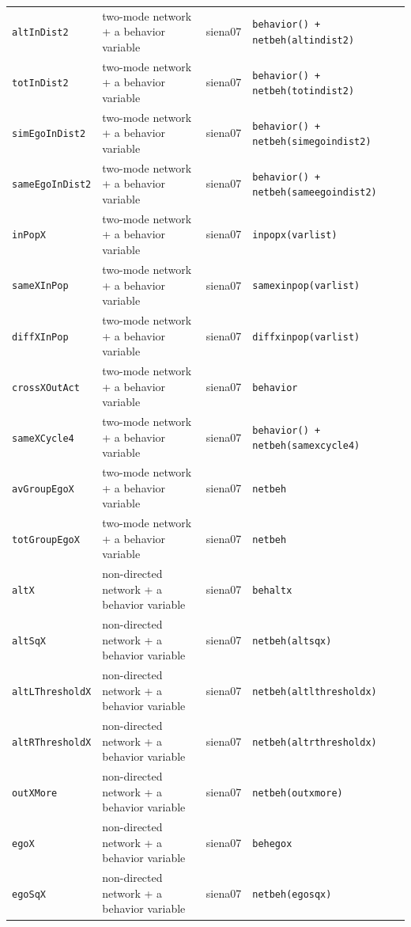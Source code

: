 \begin{longtable}{@{}p{2.6cm}p{3.2cm}p{2.9cm}p{5.4cm}@{}}
\texttt{altInDist2} & two-mode network + a behavior variable & siena07 & \texttt{behavior() + netbeh(altindist2)}\\
\texttt{totInDist2} & two-mode network + a behavior variable & siena07 & \texttt{behavior() + netbeh(totindist2)}\\
\texttt{simEgoInDist2} & two-mode network + a behavior variable & siena07 & \texttt{behavior() + netbeh(simegoindist2)}\\
\texttt{sameEgoInDist2} & two-mode network + a behavior variable & siena07 & \texttt{behavior() + netbeh(sameegoindist2)}\\
\texttt{inPopX} & two-mode network + a behavior variable & siena07 & \texttt{inpopx(varlist)}\\
\texttt{sameXInPop} & two-mode network + a behavior variable & siena07 & \texttt{samexinpop(varlist)}\\
\texttt{diffXInPop} & two-mode network + a behavior variable & siena07 & \texttt{diffxinpop(varlist)}\\
\texttt{crossXOutAct} & two-mode network + a behavior variable & siena07 & \texttt{behavior}\\
\texttt{sameXCycle4} & two-mode network + a behavior variable & siena07 & \texttt{behavior() + netbeh(samexcycle4)}\\
\texttt{avGroupEgoX} & two-mode network + a behavior variable & siena07 & \texttt{netbeh}\\
\texttt{totGroupEgoX} & two-mode network + a behavior variable & siena07 & \texttt{netbeh}\\
\texttt{altX} & non-directed network + a behavior variable & siena07 & \texttt{behaltx}\\
\texttt{altSqX} & non-directed network + a behavior variable & siena07 & \texttt{netbeh(altsqx)}\\
\texttt{altLThresholdX} & non-directed network + a behavior variable & siena07 & \texttt{netbeh(altlthresholdx)}\\
\texttt{altRThresholdX} & non-directed network + a behavior variable & siena07 & \texttt{netbeh(altrthresholdx)}\\
\texttt{outXMore} & non-directed network + a behavior variable & siena07 & \texttt{netbeh(outxmore)}\\
\texttt{egoX} & non-directed network + a behavior variable & siena07 & \texttt{behegox}\\
\texttt{egoSqX} & non-directed network + a behavior variable & siena07 & \texttt{netbeh(egosqx)}\\

\end{longtable}

